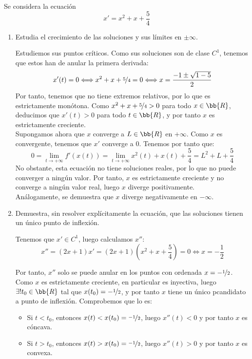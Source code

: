 \documentclass[12pt]{article}
\begin{document}
\begin{ejercicio}
    Se considera la ecuación
    \begin{equation*}
        x'=x^2+x+\dfrac{5}{4}
    \end{equation*}
    \begin{enumerate}
        \item Estudia el crecimiento de las soluciones y sus límites en $\pm \infty$.
        
        Estudiemos sus puntos críticos. Como sus soluciones son de clase $C^1$, tenemos que estos han de anular la primera derivada:
        \begin{equation*}
            x'(t)=0\Longleftrightarrow
            x^2+x+\nicefrac{5}{4}=0
            \Longleftrightarrow
            x=\dfrac{-1\pm \sqrt{1-5}}{2}
        \end{equation*}
        Por tanto, tenemos que no tiene extremos relativos, por lo que es estrictamente monótona. Como $x^2+x+\nicefrac{5}{4}>0$ para todo $x\in \bb{R}$, deducimos que $x'(t)>0$ para todo $t\in \bb{R}$, y por tanto $x$ es estrictamente creciente.\\

        Supongamos ahora que $x$ converge a $L\in \bb{R}$ en $+\infty$. Como $x$ es convergente, tenemos que $x'$ converge a $0$. Tenemos por tanto que:
        \begin{equation*}
            0=\lim_{t\to +\infty}f'(x(t))=\lim_{t\to +\infty}x^2(t)+x(t)+\dfrac{5}{4}=L^2+L+\dfrac{5}{4}
        \end{equation*}
        No obstante, esta ecuación no tiene soluciones reales, por lo que no puede converger a ningún valor. Por tanto, $x$ es estrictamente creciente y no converge a ningún valor real, luego $x$ diverge positivamente.\\

        Análogamente, se demuestra que $x$ diverge negativamente en $-\infty$.

        \item Demuestra, sin resolver explícitamente la ecuación, que las soluciones tienen un único punto de inflexión.
        

        Tenemos que $x'\in C^1$, luego calculamos $x''$:
        \begin{equation*}
            x''=(2x+1)x'=(2x+1)\left(x^2+x+\dfrac{5}{4}\right)=0\Longleftrightarrow x=-\dfrac{1}{2}
        \end{equation*}

        Por tanto, $x''$ solo se puede anular en los puntos con ordenada $x=-\nicefrac{1}{2}$. Como $x$ es estrictamente creciente, en particular es inyectiva, luego $\exists ! t_0\in \bb{R}$ tal que $x(t_0)=-\nicefrac{1}{2}$, y por tanto $x$ tiene un único pcandidato a punto de inflexión. Comprobemos que lo es:
        \begin{itemize}
            \item Si $t<t_0$, entonces $x(t)<x(t_0)=\nicefrac{-1}{2}$, luego $x''(t)<0$ y por tanto $x$ es cóncava.
            \item Si $t>t_0$, entonces $x(t)>x(t_0)=\nicefrac{-1}{2}$, luego $x''(t)>0$ y por tanto $x$ es convexa.
        \end{itemize}


\end{enumerate}
\end{ejercicio}
\end{document}
